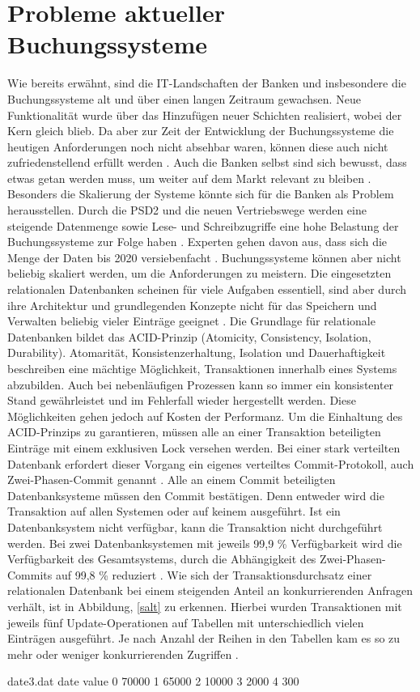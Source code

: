 \documentclass[12pt,oneside,a4paper,parskip]{scrbook}
\begin{document}
\section{Probleme aktueller Buchungssysteme}
\label{problems}
Wie bereits erwähnt, sind die IT-Landschaften der Banken und insbesondere die Buchungssysteme alt und über einen langen Zeitraum gewachsen. Neue Funktionalität wurde über das Hinzufügen neuer Schichten realisiert, wobei der Kern gleich blieb. Da aber zur Zeit der Entwicklung der Buchungssysteme die heutigen Anforderungen noch nicht absehbar waren, können diese auch nicht zufriedenstellend erfüllt werden \cite[23-27]{ITidF}\cite{bankEnzy}. Auch die Banken selbst sind sich bewusst, dass etwas getan werden muss, um weiter auf dem Markt relevant zu bleiben \cite{capgemini}.
Besonders die Skalierung der Systeme könnte sich für die Banken als Problem herausstellen. Durch die PSD2 und die neuen Vertriebswege werden eine steigende Datenmenge sowie Lese- und Schreibzugriffe eine hohe Belastung der Buchungssysteme zur Folge haben \cite{bigdataBigStorage}. Experten gehen davon aus, dass sich die Menge der Daten bis 2020 versiebenfacht \cite{versiebenfacht}. Buchungssysteme können aber nicht beliebig skaliert werden, um die Anforderungen zu meistern. Die eingesetzten relationalen Datenbanken scheinen für viele Aufgaben essentiell, sind aber durch ihre Architektur und grundlegenden Konzepte nicht für das Speichern und Verwalten beliebig vieler Einträge geeignet \cite{rdbmsBigData}. Die Grundlage für relationale Datenbanken bildet das ACID-Prinzip (Atomicity, Consistency, Isolation, Durability). Atomarität, Konsistenzerhaltung, Isolation und Dauerhaftigkeit beschreiben eine mächtige Möglichkeit, Transaktionen innerhalb eines Systems abzubilden. Auch bei nebenläufigen Prozessen kann so immer ein konsistenter Stand gewährleistet und im Fehlerfall wieder hergestellt werden. Diese Möglichkeiten gehen jedoch auf Kosten der Performanz. Um die Einhaltung des ACID-Prinzips zu garantieren, müssen alle an einer Transaktion beteiligten Einträge mit einem exklusiven Lock versehen werden. Bei einer stark verteilten Datenbank erfordert dieser Vorgang ein eigenes verteiltes Commit-Protokoll, auch Zwei-Phasen-Commit genannt \cite{dbarchitecture}. Alle an einem Commit beteiligten Datenbanksysteme müssen den Commit bestätigen. Denn entweder wird die Transaktion auf allen Systemen oder auf keinem ausgeführt. Ist ein Datenbanksystem nicht verfügbar, kann die Transaktion nicht durchgeführt werden. Bei zwei Datenbanksystemen mit jeweils 99,9 \% Verfügbarkeit wird die Verfügbarkeit des Gesamtsystems, durch die Abhängigkeit des Zwei-Phasen-Commits auf 99,8 \% reduziert \cite{BASE}. Wie sich der Transaktionsdurchsatz einer relationalen Datenbank bei einem steigenden Anteil an konkurrierenden Anfragen verhält, ist in Abbildung, \ref{salt} zu erkennen. Hierbei wurden Transaktionen mit jeweils fünf Update-Operationen auf Tabellen mit unterschiedlich vielen Einträgen ausgeführt. Je nach Anzahl der Reihen in den Tabellen kam es so zu mehr oder weniger konkurrierenden Zugriffen \cite{salt}.
\begin{filecontents}{date3.dat}
date  value
0     70000
1     65000
2     10000
3     2000
4     300
\end{filecontents}
\end{document}
